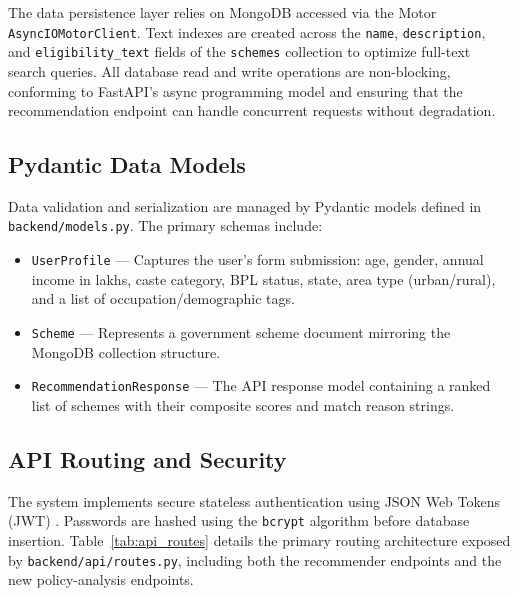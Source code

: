 \documentclass[10pt, journal, twocolumn]{IEEEtran}
\begin{document}
The data persistence layer relies on MongoDB accessed via the Motor \texttt{AsyncIOMotorClient}. Text indexes are created across the \texttt{name}, \texttt{description}, and \texttt{eligibility\_text} fields of the \texttt{schemes} collection to optimize full-text search queries. All database read and write operations are non-blocking, conforming to FastAPI's async programming model and ensuring that the recommendation endpoint can handle concurrent requests without degradation.

\subsection{Pydantic Data Models}
Data validation and serialization are managed by Pydantic models defined in \texttt{backend/models.py}. The primary schemas include:
\begin{itemize}
    \item \texttt{UserProfile} --- Captures the user's form submission: age, gender, annual income in lakhs, caste category, BPL status, state, area type (urban/rural), and a list of occupation/demographic tags.
    \item \texttt{Scheme} --- Represents a government scheme document mirroring the MongoDB collection structure.
    \item \texttt{RecommendationResponse} --- The API response model containing a ranked list of schemes with their composite scores and match reason strings.
\end{itemize}

\subsection{API Routing and Security}
The system implements secure stateless authentication using JSON Web Tokens (JWT) \cite{jwt7519}. Passwords are hashed using the \texttt{bcrypt} algorithm before database insertion. Table~\ref{tab:api_routes} details the primary routing architecture exposed by \texttt{backend/api/routes.py}, including both the recommender endpoints and the new policy-analysis endpoints.
\end{document}
